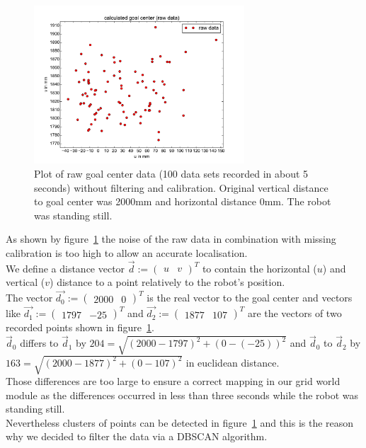 \documentclass[lnicst,a4paper]{svmultln}
\begin{document}
\begin{figure}
 	\centerline{\includegraphics[width=0.7\textwidth]{noise_data_plot.pdf}}
	{\caption{Plot of raw goal center data (100 data sets recorded in about 5 seconds) without filtering and calibration. Original vertical distance to goal center was 2000mm and horizontal distance 0mm. The robot was standing still.}
	\label{fig:noise1}}
\end{figure}

As shown by figure~\ref{fig:noise1} the noise of the raw data in combination with missing calibration is too high to allow an accurate localisation.
\\
We define a distance vector $\vec{d} := \left( \begin{array}{cc} u & v \end{array} \right)^{T}$ to contain the horizontal ($u$) and vertical ($v$) distance to a point relatively to the robot's position. 
\\
The vector 
$\vec{d_{0}} := \left( \begin{array}{cc} 2000 & 0 \end{array} \right)^{T}$ is the real vector to the goal center and vectors like
$\vec{d_{1}} := \left( \begin{array}{cc} 1797 & -25 \end{array} \right)^{T}$ and
$\vec{d_{2}} := \left( \begin{array}{cc} 1877 & 107 \end{array} \right)^{T}$
are the vectors of two recorded points shown in figure~\ref{fig:noise1}.
\\
$\vec{d}_{0}$ differs to $\vec{d}_{1}$ by
$ 204 = \sqrt{(2000 - 1797)^2 + (0 - (-25))^2}$ and 
$\vec{d}_{0}$ to $\vec{d}_{2}$
by $ 163 = \sqrt{(2000 - 1877)^2 + (0 - 107)^2}$
in euclidean distance.
\\
Those differences are too large to ensure a correct mapping in our grid world module as the differences occurred in less than three seconds while the robot was standing still.
\\
Nevertheless clusters of points can be detected in figure~\ref{fig:noise1} and this is the reason why we decided to filter the data via a DBSCAN algorithm.
\end{document}
